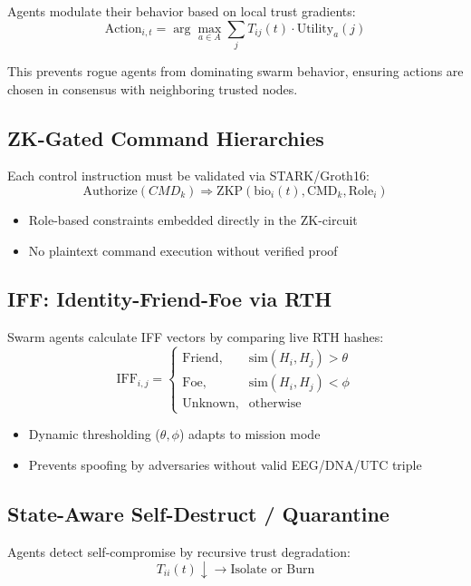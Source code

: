 \documentclass{article}
\begin{document}
Agents modulate their behavior based on local trust gradients:
\[
\text{Action}_{i,t} = \arg\max_{a \in A} \sum_j T_{ij}(t) \cdot \text{Utility}_a(j)
\]

This prevents rogue agents from dominating swarm behavior, ensuring actions are chosen in consensus with neighboring trusted nodes.

\subsection*{ZK-Gated Command Hierarchies}

Each control instruction must be validated via STARK/Groth16:
\[
\text{Authorize}(CMD_k) \Rightarrow \text{ZKP}(\text{bio}_i(t), \text{CMD}_k, \text{Role}_i)
\]

\begin{itemize}
    \item Role-based constraints embedded directly in the ZK-circuit
    \item No plaintext command execution without verified proof
\end{itemize}

\subsection*{IFF: Identity-Friend-Foe via RTH}

Swarm agents calculate IFF vectors by comparing live RTH hashes:
\[
\text{IFF}_{i,j} = \begin{cases}
\text{Friend}, & \text{sim}(H_i, H_j) > \theta \\
\text{Foe}, & \text{sim}(H_i, H_j) < \phi \\
\text{Unknown}, & \text{otherwise}
\end{cases}
\]

\begin{itemize}
    \item Dynamic thresholding (\( \theta, \phi \)) adapts to mission mode
    \item Prevents spoofing by adversaries without valid EEG/DNA/UTC triple
\end{itemize}

\subsection*{State-Aware Self-Destruct / Quarantine}

Agents detect self-compromise by recursive trust degradation:
\[
T_{ii}(t) \downarrow \rightarrow \text{Isolate or Burn}
\]
\end{document}
